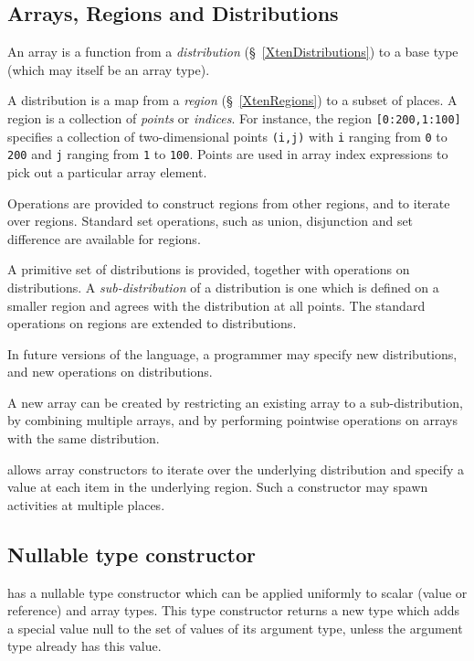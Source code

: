\subsection{Arrays, Regions and Distributions}
An \Xten{} array is a function from a {\em distribution}
(\S~\ref{XtenDistributions}) to a base type (which may itself be an
array type).

A distribution is a map from a {\em region} (\S~\ref{XtenRegions}) to a
subset of places.  A region is a collection of {\em points} or
{\em indices}. For instance, the region {\tt [0:200,1:100]} specifies
a collection of two-dimensional points {\tt (i,j)} with 
{\tt i} ranging from {\tt 0} to {\tt 200} and {\tt j} ranging
from {\tt 1} to {\tt 100}. Points are used in array index expressions
to pick out a particular array element.

Operations are provided to construct regions from other regions, and
to iterate over regions. Standard set operations, such as union,
disjunction and set difference are available for regions.

A primitive set of distributions is provided, together with operations
on distributions. A {\em sub-distribution} of a distribution is one
which is defined on a smaller region and agrees with the distribution
at all points.  The standard operations on regions are extended to
distributions.

In future versions of the language, a programmer may specify new
distributions, and new operations on distributions.

A new array can be created by restricting an existing array to a
sub-distribution, by combining multiple arrays, and by performing
pointwise operations on arrays with the same distribution.

\Xten{} allows array constructors to iterate over the underlying
distribution and specify a value at each item in the underlying
region. Such a constructor may spawn activities at multiple places.


\subsection{Nullable type constructor}

\Xten{} has a {\cf nullable} type constructor which can be applied uniformly to
scalar (value or reference) and array types. This type constructor
returns a new type which adds a special value {\cf null} to the set of
values of its argument type, unless the argument type already has this
value.

